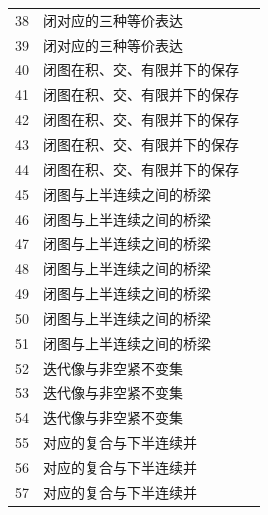 \documentclass[11pt,a4paper]{article}
\theoremstyle{definition}\newtheorem{definition}{定义}\newtheorem{example}{例}
\begin{document}
\begin{longtable}{r p{.66\linewidth} r}
38 & 闭对应的三种等价表达 & \pageref{g:108:35}\\

39 & 闭对应的三种等价表达 & \pageref{g:108:35}\\

40 & 闭图在积、交、有限并下的保存 & \pageref{g:108:40}\\

41 & 闭图在积、交、有限并下的保存 & \pageref{g:108:40}\\

42 & 闭图在积、交、有限并下的保存 & \pageref{g:108:40}\\

43 & 闭图在积、交、有限并下的保存 & \pageref{g:108:40}\\

44 & 闭图在积、交、有限并下的保存 & \pageref{g:108:40}\\

45 & 闭图与上半连续之间的桥梁 & \pageref{g:108:45}\\

46 & 闭图与上半连续之间的桥梁 & \pageref{g:108:45}\\

47 & 闭图与上半连续之间的桥梁 & \pageref{g:108:45}\\

48 & 闭图与上半连续之间的桥梁 & \pageref{g:108:45}\\

49 & 闭图与上半连续之间的桥梁 & \pageref{g:108:45}\\

50 & 闭图与上半连续之间的桥梁 & \pageref{g:108:45}\\

51 & 闭图与上半连续之间的桥梁 & \pageref{g:108:45}\\

52 & 迭代像与非空紧不变集 & \pageref{g:108:52}\\

53 & 迭代像与非空紧不变集 & \pageref{g:108:52}\\

54 & 迭代像与非空紧不变集 & \pageref{g:108:52}\\

55 & 对应的复合与下半连续并 & \pageref{g:108:55}\\

56 & 对应的复合与下半连续并 & \pageref{g:108:55}\\

57 & 对应的复合与下半连续并 & \pageref{g:108:55}\\


\end{longtable}
\end{document}
